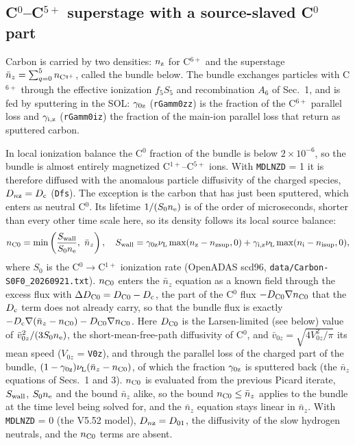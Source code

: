 \documentclass[11pt]{article}
\def\r#1{{\rm#1}}
\def\nee{n_\r{e}}
\def\ni{n_\r{i}}
\def\nz{n_\r{z}}
\def\nsup#1{n_\r{#1sup}}
\def\nnz{\bar{n}_{z}}
\def\nuL{\nu_\r{L}}
\begin{document}
\subsection{C$^0$--C$^{5+}$ superstage with a source-slaved C$^0$ part}

Carbon is carried by two densities: $\nz$ for C$^{6+}$ and the superstage
$\nnz = \sum_{q=0}^{5} n_{\r{C}^{q+}}$, called the bundle below.  The bundle
exchanges particles with C$^{6+}$ through the effective ionization $f_5S_5$
and recombination $A_6$ of Sec.~1, and is fed by sputtering in the SOL:
$\gamma_\r{0z}$ (\texttt{rGamm0zz}) is the fraction of the C$^{6+}$ parallel loss
and $\gamma_\r{i,z}$ (\texttt{rGamm0iz}) the fraction of the main-ion parallel
loss that return as sputtered carbon.

In local ionization balance the C$^0$ fraction of the bundle is below
$2\times10^{-6}$, so the bundle is almost entirely magnetized C$^{1+}$--C$^{5+}$
ions.  With \texttt{MDLNZD} = 1 it is therefore diffused with the anomalous
particle diffusivity of the charged species, $D_{n\r{z}} = D_\r{c}$ (\texttt{Dfs}).
The exception is the carbon that has just been sputtered, which enters as
neutral C$^0$.  Its lifetime $1/(S_0\nee)$ is of the order of microseconds,
shorter than every other time scale here, so its density follows its local
source balance:
\begin{equation}
  n_\r{C0} = \min\left(\frac{S_\r{wall}}{S_0\nee},\ \nnz\right),\quad
  S_\r{wall} = \gamma_\r{0z}\nuL \max(\nz-\nsup{z},0) + \gamma_\r{i,z}\nuL\max(\ni-\nsup{i},0),
\end{equation}
where $S_0$ is the C$^0\to$C$^{1+}$ ionization rate (OpenADAS scd96,
\texttt{data/Carbon-S0F0\_20260921.txt}).  $n_\r{C0}$ enters the $\nnz$
equation as a known field through the excess flux with
$\Delta D_\r{C0} = D_\r{C0} - D_\r{c}$, the part of the C$^0$ flux
$-D_\r{C0}\nabla n_\r{C0}$ that the $D_\r{c}$ term does not already carry, so that the
bundle flux is exactly $-D_\r{c}\nabla(\nnz-n_\r{C0}) - D_\r{C0}\nabla n_\r{C0}$.
Here $D_\r{C0}$ is the Larsen-limited (see below) value of $\bar v_{0z}^2/(3S_0\nee)$,
the short-mean-free-path diffusivity of C$^0$, and $\bar v_{0z} = \sqrt{4V_{0z}^2/\pi}$
its mean speed ($V_{0z}$ = \texttt{V0z}), and through the parallel loss of the
charged part of the bundle, $(1-\gamma_\r{0z})\nuL(\nnz-n_\r{C0})$, of which the
fraction $\gamma_\r{0z}$ is sputtered back (the $\nnz$ equations of Secs.~1 and 3).
$n_\r{C0}$ is evaluated from the previous Picard iterate, $S_\r{wall}$, $S_0\nee$ and the
bound $\nnz$ alike, so the bound $n_\r{C0}\le\nnz$ applies to the bundle at the time level
being solved for, and the $\nnz$ equation stays linear in $\nnz$.  With \texttt{MDLNZD} = 0 (the V5.52 model),
$D_{n\r{z}} = D_{01}$, the diffusivity of the slow hydrogen neutrals, and the
$n_\r{C0}$ terms are absent.
\end{document}
